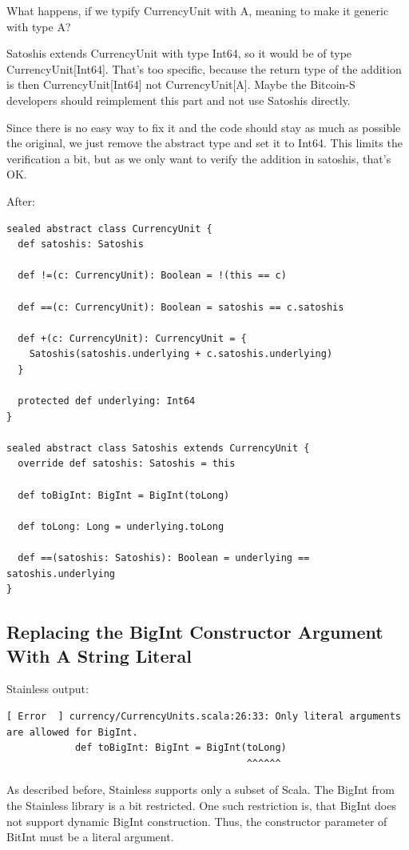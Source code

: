 \documentclass[runningheads]{llncs}
\begin{document}
What happens, if we typify CurrencyUnit with A, meaning to make it generic with type A?

Satoshis extends CurrencyUnit with type Int64, so it would be of type CurrencyUnit[Int64].
That's too specific, because the return type of the addition is then CurrencyUnit[Int64] not CurrencyUnit[A].
Maybe the Bitcoin-S developers should reimplement this part and not use Satoshis directly.

Since there is no easy way to fix it and the code should stay as much as possible the original, we just remove the abstract type and set it to Int64.
This limits the verification a bit, but as we only want to verify the addition in satoshis, that's OK.

After:
\begin{lstlisting}[style=scala]
sealed abstract class CurrencyUnit {
  def satoshis: Satoshis

  def !=(c: CurrencyUnit): Boolean = !(this == c)

  def ==(c: CurrencyUnit): Boolean = satoshis == c.satoshis

  def +(c: CurrencyUnit): CurrencyUnit = {
    Satoshis(satoshis.underlying + c.satoshis.underlying)
  }

  protected def underlying: Int64
}

sealed abstract class Satoshis extends CurrencyUnit {
  override def satoshis: Satoshis = this

  def toBigInt: BigInt = BigInt(toLong)

  def toLong: Long = underlying.toLong

  def ==(satoshis: Satoshis): Boolean = underlying == satoshis.underlying
}
\end{lstlisting}


\subsection{Replacing the BigInt Constructor Argument With A String Literal}

Stainless output:
\begin{lstlisting}[style=stainless]
[ Error  ] currency/CurrencyUnits.scala:26:33: Only literal arguments are allowed for BigInt.
            def toBigInt: BigInt = BigInt(toLong)
                                          ^^^^^^
\end{lstlisting}

As described before, Stainless supports only a subset of Scala.
The BigInt from the Stainless library is a bit restricted.
One such restriction is, that BigInt does not support dynamic BigInt construction.
Thus, the constructor parameter of BitInt must be a literal argument.
\end{document}
